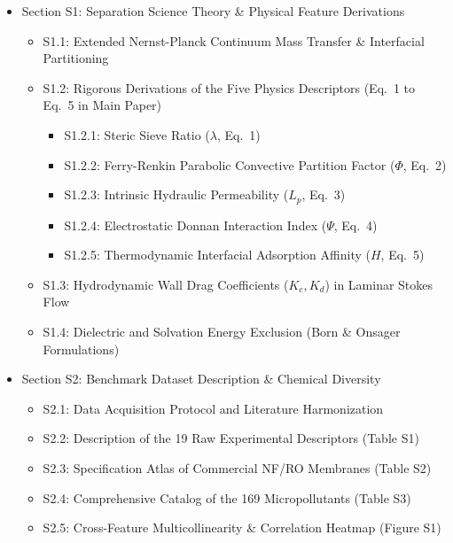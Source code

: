 \documentclass[11pt]{article}
\begin{document}
\begin{itemize}[leftmargin=1.5cm, label=$\blacktriangleright$]
    \item Section S1: Separation Science Theory \& Physical Feature Derivations
    \begin{itemize}[label=$\circ$]
        \item S1.1: Extended Nernst-Planck Continuum Mass Transfer \& Interfacial Partitioning
        \item S1.2: Rigorous Derivations of the Five Physics Descriptors (Eq.~1 to Eq.~5 in Main Paper)
        \begin{itemize}[label=--]
            \item S1.2.1: Steric Sieve Ratio ($\lambda$, Eq.~1)
            \item S1.2.2: Ferry-Renkin Parabolic Convective Partition Factor ($\Phi$, Eq.~2)
            \item S1.2.3: Intrinsic Hydraulic Permeability ($L_p$, Eq.~3)
            \item S1.2.4: Electrostatic Donnan Interaction Index ($\Psi$, Eq.~4)
            \item S1.2.5: Thermodynamic Interfacial Adsorption Affinity ($H$, Eq.~5)
        \end{itemize}
        \item S1.3: Hydrodynamic Wall Drag Coefficients ($K_c, K_d$) in Laminar Stokes Flow
        \item S1.4: Dielectric and Solvation Energy Exclusion (Born \& Onsager Formulations)
    \end{itemize}
    \item Section S2: Benchmark Dataset Description \& Chemical Diversity
    \begin{itemize}[label=$\circ$]
        \item S2.1: Data Acquisition Protocol and Literature Harmonization
        \item S2.2: Description of the 19 Raw Experimental Descriptors (Table S1)
        \item S2.3: Specification Atlas of Commercial NF/RO Membranes (Table S2)
        \item S2.4: Comprehensive Catalog of the 169 Micropollutants (Table S3)
        \item S2.5: Cross-Feature Multicollinearity \& Correlation Heatmap (Figure S1)

\end{itemize}
\end{itemize}
\end{document}

